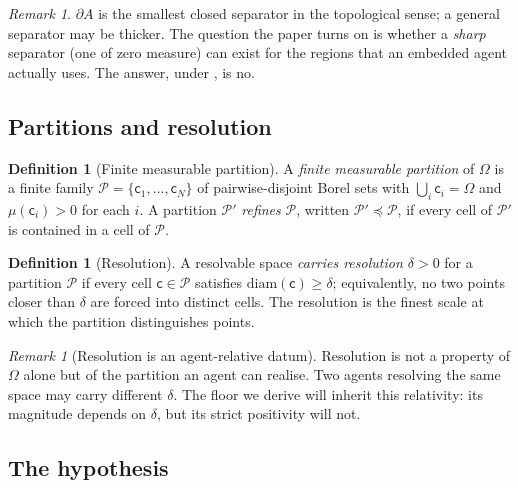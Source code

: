 \documentclass[11pt,a4paper]{article}
\theoremstyle{thmstyle}
\theoremstyle{definition}
\newtheorem{definition}[theorem]{Definition}
\theoremstyle{remark}
\newtheorem{remark}[theorem]{Remark}
\newcommand{\Space}{\Omega}
\newcommand{\Bdy}{\partial}
\newcommand{\diam}{\mathrm{diam}}
\newcommand{\reso}{\delta}
\newcommand{\Part}{\mathscr{P}}
\newcommand{\cell}{\mathsf{c}}
\begin{document}
\begin{remark}
$\Bdy A$ is the smallest closed separator in the topological sense; a general
separator may be thicker. The question the paper turns on is whether a
\emph{sharp} separator (one of zero measure) can exist for the regions that an
embedded agent actually uses. The answer, under , is no.
\end{remark}

\subsection{Partitions and resolution}

\begin{definition}[Finite measurable partition]
\label{def:partition}
A \emph{finite measurable partition} of $\Space$ is a finite family
$\Part=\{\cell_1,\dots,\cell_N\}$ of pairwise-disjoint Borel sets with
$\bigcup_i\cell_i=\Space$ and $\mu(\cell_i)>0$ for each $i$. A partition
$\Part'$ \emph{refines} $\Part$, written $\Part'\preceq\Part$, if every cell of
$\Part'$ is contained in a cell of $\Part$.
\end{definition}

\begin{definition}[Resolution]
\label{def:resolution}
A resolvable space \emph{carries resolution $\reso>0$} for a partition $\Part$
if every cell $\cell\in\Part$ satisfies $\diam(\cell)\ge\reso$; equivalently, no
two points closer than $\reso$ are forced into distinct cells. The resolution
is the finest scale at which the partition distinguishes points.
\end{definition}

\begin{remark}[Resolution is an agent-relative datum]
\label{rem:reso-relative}
Resolution is not a property of $\Space$ alone but of the partition an agent can
realise. Two agents resolving the same space may carry different $\reso$. The
floor we derive will inherit this relativity: its magnitude depends on $\reso$,
but its strict positivity will not.
\end{remark}

\subsection{The hypothesis}
\end{document}
